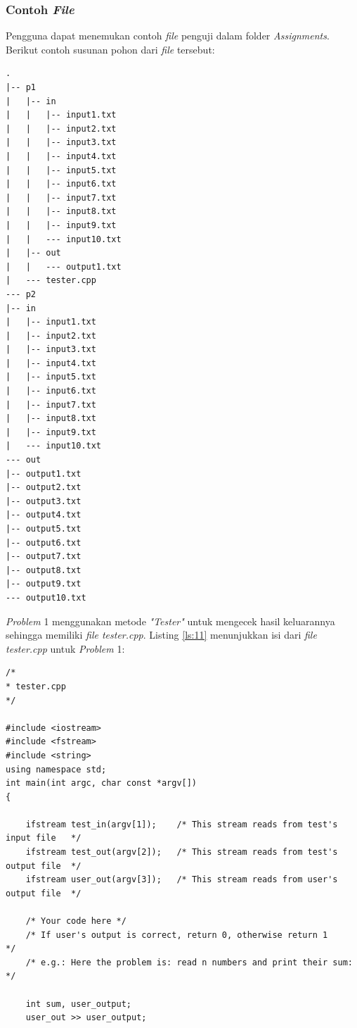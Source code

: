\documentclass[a4paper,twoside]{article}
\begin{document}
\begin{enumerate}
		\subsubsection*{Contoh \textit{File}}
		\label{subsubsec:contoh_file}
		Pengguna dapat menemukan contoh \textit{file} penguji dalam folder \textit{Assignments}. Berikut contoh susunan pohon dari \textit{file} tersebut:
		
		\begin{lstlisting}[basicstyle=\ttfamily, frame=single,
		columns=fullflexible, keepspaces=true, breaklines=true, label=ls:10]
.
|-- p1
|   |-- in
|   |   |-- input1.txt
|   |   |-- input2.txt
|   |   |-- input3.txt
|   |   |-- input4.txt
|   |   |-- input5.txt
|   |   |-- input6.txt
|   |   |-- input7.txt
|   |   |-- input8.txt
|   |   |-- input9.txt
|   |   --- input10.txt
|   |-- out
|   |   --- output1.txt
|   --- tester.cpp
--- p2
|-- in
|   |-- input1.txt
|   |-- input2.txt
|   |-- input3.txt
|   |-- input4.txt
|   |-- input5.txt
|   |-- input6.txt
|   |-- input7.txt
|   |-- input8.txt
|   |-- input9.txt
|   --- input10.txt
--- out
|-- output1.txt
|-- output2.txt
|-- output3.txt
|-- output4.txt
|-- output5.txt
|-- output6.txt
|-- output7.txt
|-- output8.txt
|-- output9.txt
--- output10.txt
		\end{lstlisting}
		
		\textit{Problem} 1 menggunakan metode \textit{"Tester"} untuk mengecek hasil keluarannya sehingga memiliki \textit{file tester.cpp}. Listing \ref{ls:11} menunjukkan isi dari \textit{file tester.cpp} untuk \textit{Problem} 1:
		
		\begin{lstlisting}[basicstyle=\ttfamily, frame=single,
		columns=fullflexible, keepspaces=true, breaklines=true, label=ls:11, caption=Isi \textit{File tester.cpp} untuk \textit{Problem} 1]
/*
* tester.cpp
*/

#include <iostream>
#include <fstream>
#include <string>
using namespace std;
int main(int argc, char const *argv[])
{

	ifstream test_in(argv[1]);    /* This stream reads from test's input file   */
	ifstream test_out(argv[2]);   /* This stream reads from test's output file  */
	ifstream user_out(argv[3]);   /* This stream reads from user's output file  */
	
	/* Your code here */
	/* If user's output is correct, return 0, otherwise return 1       */
	/* e.g.: Here the problem is: read n numbers and print their sum:  */
	
	int sum, user_output;
	user_out >> user_output;
	

\end{lstlisting}
\end{enumerate}
\end{document}
